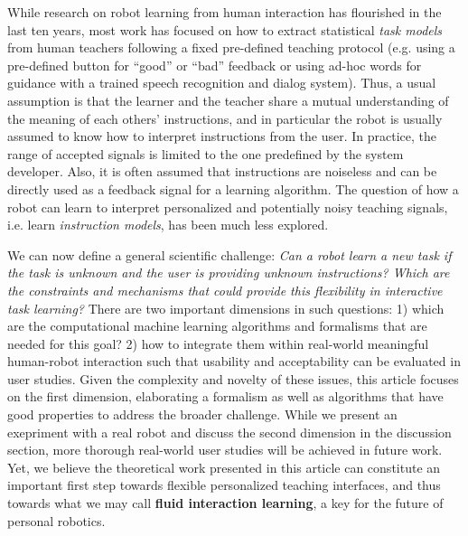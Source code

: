 While research on robot learning from human interaction has flourished in the last ten years, most work has focused on how to extract statistical \textit{task models} from human teachers following a fixed pre-defined teaching protocol (e.g. using a pre-defined button for ``good'' or ``bad'' feedback or using ad-hoc words for guidance with a trained speech recognition and dialog system). Thus, a usual assumption is that the learner and the teacher share a mutual understanding of the meaning of each others' instructions, and in particular the robot is usually assumed to know how to interpret instructions from the user. In practice, the range of accepted signals is limited to the one predefined by the system developer. Also, it is often assumed that instructions are noiseless and can be directly used as a feedback signal for a learning algorithm. The question of how a robot can learn to interpret personalized and potentially noisy teaching signals, i.e. learn \textit{instruction models}, has been much less explored.

We can now define a general scientific challenge: \textit{Can a robot learn a new task if the task is unknown and the user is providing unknown instructions? Which are the constraints and mechanisms that could provide this flexibility in interactive task learning?} There are two important dimensions in such questions: 1) which are the computational machine learning algorithms and formalisms that are needed for this goal? 2) how to integrate them within real-world meaningful human-robot interaction such that usability and acceptability can be evaluated in user studies. Given the complexity and novelty of these issues, this article focuses on the first dimension, elaborating a formalism as well as algorithms that have good properties to address the broader challenge. While we present an exepriment with a real robot and discuss the second dimension in the discussion section, more thorough real-world user studies will be achieved in future work. Yet, we believe the theoretical work presented in this article can constitute an important first step towards flexible personalized teaching interfaces, and thus towards what we may call \textbf{fluid interaction learning}, a key for the future of personal robotics.

